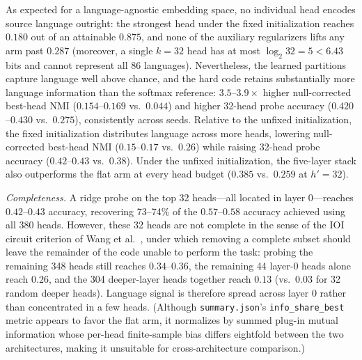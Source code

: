 As expected for a language-agnostic embedding space, no individual head
encodes source language outright: the strongest head under the fixed
initialization reaches $0.180$ out of an attainable $0.875$, and none of
the auxiliary regularizers lifts any arm past $0.287$ (moreover, a single
$k{=}32$ head has at most $\log_2 32 = 5 < 6.43$ bits and cannot represent
all 86 languages). Nevertheless, the learned partitions capture language
well above chance, and the hard code retains substantially more language
information than the softmax reference: $3.5$--$3.9\times$ higher
null-corrected best-head NMI ($0.154$--$0.169$ vs.\ $0.044$) and higher
32-head probe accuracy ($0.420$--$0.430$ vs.\ $0.275$), consistently
across seeds. Relative to the unfixed initialization, the fixed
initialization distributes language across more heads, lowering
null-corrected best-head NMI ($0.15$--$0.17$ vs.\ $0.26$) while raising
32-head probe accuracy ($0.42$--$0.43$ vs.\ $0.38$). Under the unfixed
initialization, the five-layer stack also outperforms the flat arm at
every head budget ($0.385$ vs.\ $0.259$ at $h'{=}32$).

\emph{Completeness.} A ridge probe on the top 32 heads---all located in
layer 0---reaches $0.42$--$0.43$ accuracy, recovering 73--74\% of the
$0.57$--$0.58$ accuracy achieved using all 380 heads. However, these 32
heads are not complete in the sense of the IOI circuit criterion of Wang
et al.~\cite{wang2023ioi}, under which removing a complete subset should
leave the remainder of the code unable to perform the task: probing the
remaining 348 heads still reaches $0.34$--$0.36$, the remaining 44
layer-0 heads alone reach $0.26$, and the 304 deeper-layer heads together
reach $0.13$ (vs.\ $0.03$ for 32 random deeper heads). Language signal is
therefore spread across layer 0 rather than concentrated in a few heads.
(Although \texttt{summary.json}'s \texttt{info\_share\_best} metric
appears to favor the flat arm, it normalizes by summed plug-in mutual
information whose per-head finite-sample bias differs eightfold between
the two architectures, making it unsuitable for cross-architecture
comparison.)

